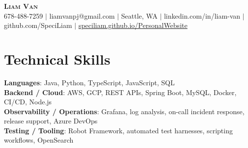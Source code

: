 \documentclass[letterpaper,11pt]{article}
\begin{document}

%
\begin{center}
    \textbf{\Huge \scshape Liam Van} \\ \vspace{1pt}
    \small 678-488-7259 $|$ \small {liamvanpj@gmail.com} $|$ Seattle, WA
 {{$|$ linkedin.com/in/liam-van} {$|$ github.com/SpeciLiam} {$|$ \href{https://speciliam.github.io/PersonalWebsite}{speciliam.github.io/PersonalWebsite}}}

\end{center}

\section{Technical Skills}
 \begin{itemize}[leftmargin=0.15in, label={}]
    \small{\item{
     \textbf{Languages}{: Java, Python, TypeScript, JavaScript, SQL} \\
     \textbf{Backend / Cloud}{: AWS, GCP, REST APIs, Spring Boot, MySQL, Docker, CI/CD, Node.js} \\
     \textbf{Observability / Operations}{: Grafana, log analysis, on-call incident response, release support, Azure DevOps} \\
     \textbf{Testing / Tooling}{: Robot Framework, automated test harnesses, scripting workflows, OpenSearch} \\
    }}
 \end{itemize}
%

\end{document}
